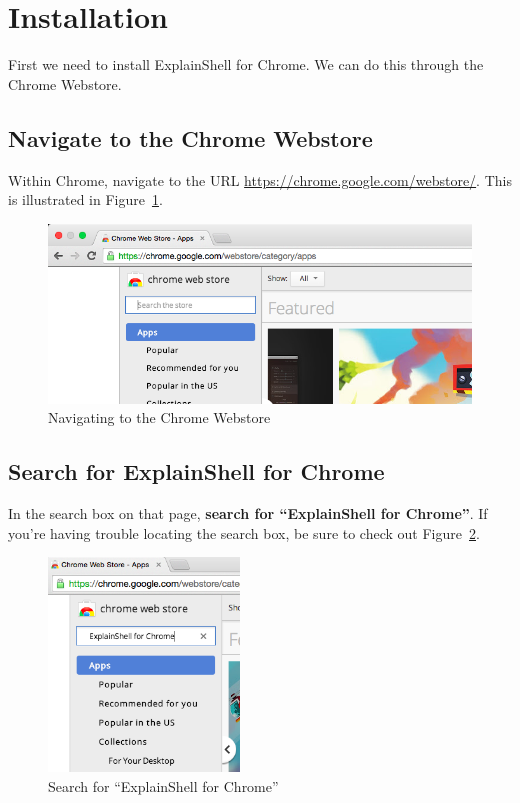 \documentclass[11pt]{article}
\begin{document}
\newpage

\section{Installation}
First we need to install ExplainShell for Chrome. We can do this through the Chrome Webstore.

\subsection{Navigate to the Chrome Webstore}
Within Chrome, navigate to the URL \url{https://chrome.google.com/webstore/}. This is illustrated in Figure~\ref{chrome-webstore}.

\begin{figure}[H]
  \begin{center}
    \includegraphics[width=\textwidth,height=\textheight,keepaspectratio]{01chrome-webstore}
  \end{center}
  \caption{Navigating to the Chrome Webstore}
  \label{chrome-webstore}
\end{figure}

\subsection{Search for ExplainShell for Chrome}
In the search box on that page, \textbf{search for ``ExplainShell for Chrome''}. If you're having trouble locating the search box, be sure to check out Figure~\ref{search-box}.

\begin{figure}[H]
  \begin{center}
    \includegraphics[width=2in, keepaspectratio]{02search-box}
  \end{center}
  \caption{Search for ``ExplainShell for Chrome''}
  \label{search-box}
\end{figure}
\end{document}
